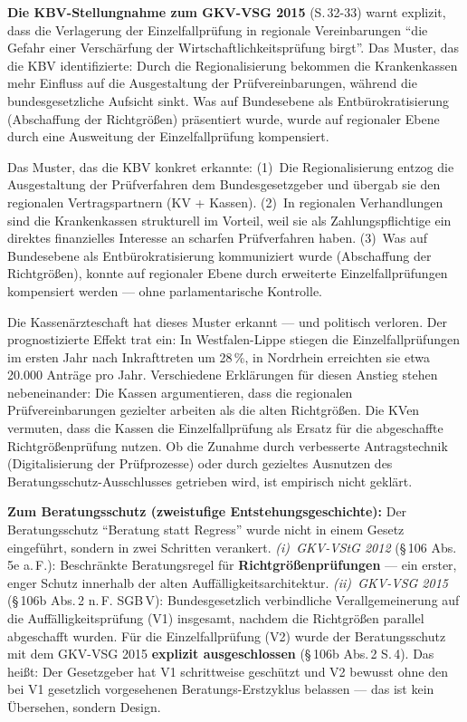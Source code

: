 \documentclass{umbruch-position}
\begin{document}
\textbf{Die KBV-Stellungnahme zum GKV-VSG 2015} (S.\,32-33) warnt explizit, dass die Verlagerung der Einzelfallprüfung in regionale Vereinbarungen ``die Gefahr einer Verschärfung der Wirtschaftlichkeitsprüfung birgt''. Das Muster, das die KBV identifizierte: Durch die Regionalisierung bekommen die Krankenkassen mehr Einfluss auf die Ausgestaltung der Prüfvereinbarungen, während die bundesgesetzliche Aufsicht sinkt. Was auf Bundesebene als Entbürokratisierung (Abschaffung der Richtgrößen) präsentiert wurde, wurde auf regionaler Ebene durch eine Ausweitung der Einzelfallprüfung kompensiert.

Das Muster, das die KBV konkret erkannte: (1)~Die Regionalisierung entzog die Ausgestaltung der Prüfverfahren dem Bundesgesetzgeber und übergab sie den regionalen Vertragspartnern (KV + Kassen). (2)~In regionalen Verhandlungen sind die Krankenkassen strukturell im Vorteil, weil sie als Zahlungspflichtige ein direktes finanzielles Interesse an scharfen Prüfverfahren haben. (3)~Was auf Bundesebene als Entbürokratisierung kommuniziert wurde (Abschaffung der Richtgrößen), konnte auf regionaler Ebene durch erweiterte Einzelfallprüfungen kompensiert werden --- ohne parlamentarische Kontrolle.

Die Kassenärzteschaft hat dieses Muster erkannt --- und politisch verloren. Der prognostizierte Effekt trat ein: In Westfalen-Lippe stiegen die Einzelfallprüfungen im ersten Jahr nach Inkrafttreten um 28\,\%, in Nordrhein erreichten sie etwa 20.000 Anträge pro Jahr. Verschiedene Erklärungen für diesen Anstieg stehen nebeneinander: Die Kassen argumentieren, dass die regionalen Prüfvereinbarungen gezielter arbeiten als die alten Richtgrößen. Die KVen vermuten, dass die Kassen die Einzelfallprüfung als Ersatz für die abgeschaffte Richtgrößenprüfung nutzen. Ob die Zunahme durch verbesserte Antragstechnik (Digitalisierung der Prüfprozesse) oder durch gezieltes Ausnutzen des Beratungsschutz-Ausschlusses getrieben wird, ist empirisch nicht geklärt.

\textbf{Zum Beratungsschutz (zweistufige Entstehungsgeschichte):} Der Beratungsschutz ``Beratung statt Regress'' wurde nicht in einem Gesetz eingeführt, sondern in zwei Schritten verankert. \textit{(i)~GKV-VStG 2012} (\S\,106 Abs.\,5e a.\,F.): Beschränkte Beratungsregel für \textbf{Richtgrößenprüfungen} --- ein erster, enger Schutz innerhalb der alten Auffälligkeitsarchitektur. \textit{(ii)~GKV-VSG 2015} (\S\,106b Abs.\,2 n.\,F. SGB\,V): Bundesgesetzlich verbindliche Verallgemeinerung auf die Auffälligkeitsprüfung (V1) insgesamt, nachdem die Richtgrößen parallel abgeschafft wurden. Für die Einzelfallprüfung (V2) wurde der Beratungsschutz mit dem GKV-VSG 2015 \textbf{explizit ausgeschlossen} (\S\,106b Abs.\,2 S.\,4). Das heißt: Der Gesetzgeber hat V1 schrittweise geschützt und V2 bewusst ohne den bei V1 gesetzlich vorgesehenen Beratungs-Erstzyklus belassen --- das ist kein Übersehen, sondern Design.
\end{document}
